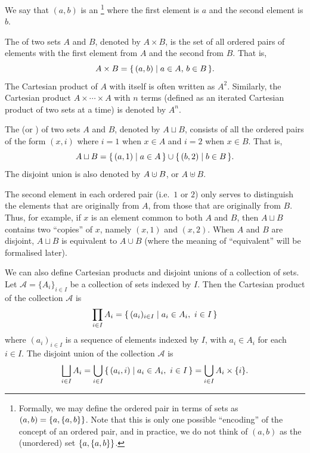 We say that $(a, b)$ is an \footnote{Formally, we may define the ordered pair in terms of sets as $(a, b) = \qty{a, \qty{a, b}}$. Note that this is only one possible ``encoding'' of the concept of an ordered pair, and in practice, we do not think of $(a, b)$ as the (unordered) set $\qty{a, \qty{a, b}}$.} where the first element is $a$ and the second element is $b$.

The  of two sets $A$ and $B$, denoted by $A \times B$, is the set of all ordered pairs of elements with the first element from $A$ and the second from $B$. That is,
\begin{equation*}
A \times B = \qty{\, (a, b) \mid a \in A,\, b \in B \,}.
\end{equation*}
The Cartesian product of $A$ with itself is often written as $A^2$. Similarly, the Cartesian product $A \times \cdots \times A$ with $n$ terms (defined as an iterated Cartesian product of two sets at a time) is denoted by $A^n$. 

The  (or ) of two sets $A$ and $B$, denoted by $A \sqcup B$, consists of all the ordered pairs of the form $(x, i)$ where $i = 1$ when $x \in A$ and $i = 2$ when $x \in B$. That is,
\begin{equation*}
A \sqcup B = \qty{\, (a, 1) \mid a \in A \,} \cup \qty{\, (b, 2) \mid b \in B \,}.
\end{equation*}
The disjoint union is also denoted by $A \mathbin{\mathaccent\cdot\cup} B$, or $A \uplus B$.

\begin{Note*}
The second element in each ordered pair (i.e.\ $1$ or $2$) only serves to distinguish the elements that are originally from $A$, from those that are originally from $B$. Thus, for example, if $x$ is an element common to both $A$ and $B$, then $A \sqcup B$ contains two ``copies'' of $x$, namely $(x, 1)$ and $(x, 2)$. When $A$ and $B$ are disjoint, $A \sqcup B$ is equivalent to $A \cup B$ (where the meaning of ``equivalent'' will be formalised later).
\end{Note*}

We can also define Cartesian products and disjoint unions of a collection of sets. Let $\mathcal A = \{A_i\}_{i \in I}$ be a collection of sets indexed by $I$. Then the Cartesian product of the collection $\mathcal A$ is
\begin{equation*}
\prod_{i \in I} A_i = \qty{\, (a_i)_{i \in I} \mid a_i \in A_i,~ i \in I \,}
\end{equation*}
where $(a_i)_{i \in I}$ is a sequence of elements indexed by $I$, with $a_i \in A_i$ for each $i \in I$. The disjoint union of the collection $\mathcal A$ is
\begin{equation*}
\bigsqcup_{i \in I} A_i = \bigcup_{i \in I} \qty{\, (a_i, i) \mid a_i \in A_i,~ i \in I \,} = \bigcup_{i \in I} A_i \times \{i\}.
\end{equation*}

